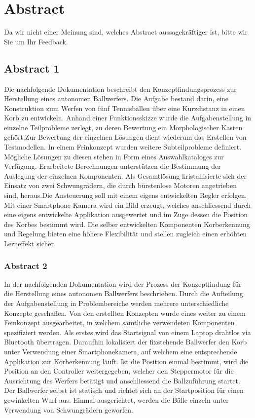 \section*{Abstract}

Da wir nicht einer Meinung sind, welches Abstract aussagekräftiger ist, bitte wir Sie um Ihr Feedback.

\subsection{Abstract 1}
Die nachfolgende Dokumentation beschreibt den Konzeptfindungsprozess zur Herstellung eines autonomen Ballwerfers. Die Aufgabe bestand darin, eine Konstruktion zum Werfen von fünf Tennisbällen über eine Kurzdistanz in einen Korb zu entwickeln. Anhand einer Funktionsskizze wurde die Aufgabenstellung in einzelne Teilprobleme zerlegt, zu deren Bewertung ein Morphologischer Kasten gehört.Zur Bewertung der einzelnen Lösungen dient wiederum das Erstellen von Testmodellen. In einem Feinkonzept wurden weitere Subteilprobleme definiert. Mögliche Lösungen zu diesen stehen in Form eines Auswahlkataloges zur Verfügung. Erarbeitete Berechnungen unterstützen die Bestimmung der Auslegung der einzelnen Komponenten. Als Gesamtlösung kristallisierte sich der Einsatz von zwei Schwungrädern, die durch bürstenlose Motoren angetrieben sind, heraus.Die Ansteuerung soll mit einem eigens entwickelten Regler erfolgen. Mit einer Smartphone-Kamera wird ein Bild erzeugt, welches anschliessend durch eine eigens entwickelte Applikation ausgewertet und im Zuge dessen die Position des Korbes bestimmt wird. Die selber entwickelten Komponenten Korberkennung und Regelung bieten eine höhere Flexibilität und stellen zugleich einen erhöhten Lerneffekt sicher.

\subsubsection{Abstract 2}
In der nachfolgenden Dokumentation wird der Prozess der Konzeptfindung für die Herstellung eines autonomen Ballwerfers beschrieben. Durch die Aufteilung der Aufgabenstellung in Problembereiche werden mehrere unterschiedliche Konzepte geschaffen. Von den erstellten Konzepten wurde eines weiter zu einem Feinkonzept ausgearbeitet, in welchem sämtliche verwendeten Komponenten spezifiziert werden. Als erstes wird das Startsignal von einem Laptop drahtlos via Bluetooth übertragen. Daraufhin lokalisiert der fixstehende Ballwerfer den Korb unter Verwendung einer Smartphonekamera, auf welchem eine entsprechende Applikation zur Korberkennung läuft. Ist die Position einmal bestimmt, wird die Position an den Controller weitergegeben, welcher den Steppermotor für die Ausrichtung des Werfers betätigt und anschliessend die Ballzuführung startet. Der Ballwerfer selbst ist statisch und richtet sich an der Startposition für einen gewinkelten Wurf aus. Einmal ausgerichtet, werden die Bälle einzeln unter Verwendung von Schwungrädern geworfen.
